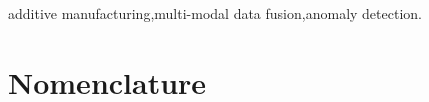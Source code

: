 \documentclass[preprint,12pt]{elsarticle}
\begin{document}
\begin{frontmatter}
\begin{abstract}
\end{abstract}



\begin{keyword}

additive manufacturing\sep multi-modal data fusion\sep anomaly detection.

\end{keyword}

\end{frontmatter}




\section{Nomenclature}

\end{document}
